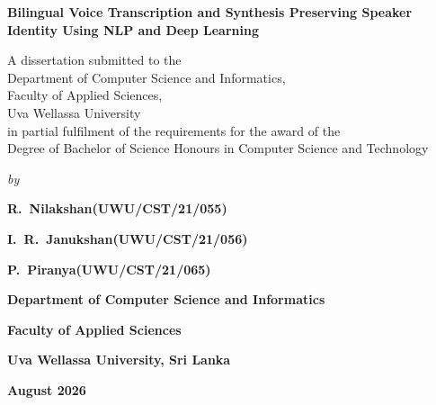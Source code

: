 \documentclass[12pt,a4paper,oneside]{report}
\newcommand{\thesistitle}{Bilingual Voice Transcription and Synthesis Preserving
Speaker Identity Using NLP and Deep Learning}
\newcommand{\degreename}{Bachelor of Science Honours in Computer Science and Technology}
\newcommand{\submissionmonth}{August 2026}
\begin{document}
\thispagestyle{empty}
\begin{center}
  \singlespacing\setlength{\parskip}{0pt}
  \vspace*{1.2cm}

  {\LARGE\bfseries \thesistitle\par}

  \vspace{2.0cm}

  A dissertation submitted to the\\[0.4em]
  Department of Computer Science and Informatics,\\
  Faculty of Applied Sciences,\\
  Uva Wellassa University\\[0.8em]
  in partial fulfilment of the requirements for the award of the\\
  Degree of \degreename

  \vspace{1.6cm}

  \emph{by}

  \vspace{0.8em}

  {\large\bfseries R.\ Nilakshan\quad (UWU/CST/21/055)\par}
  {\large\bfseries I.\ R.\ Janukshan\quad (UWU/CST/21/056)\par}
  {\large\bfseries P.\ Piranya\quad (UWU/CST/21/065)\par}

  \vspace{1.6cm}

  {\bfseries Department of Computer Science and Informatics\par}
  {\bfseries Faculty of Applied Sciences\par}
  {\bfseries Uva Wellassa University, Sri Lanka\par}

  \vspace{1.4cm}

  {\bfseries \submissionmonth\par}
\end{center}
\clearpage




\end{document}
